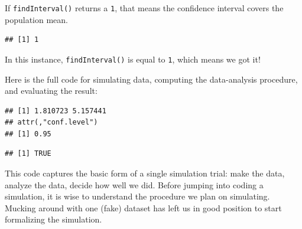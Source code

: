 \documentclass[
]{book}
\newenvironment{Shaded}{\begin{snugshade}}{\end{snugshade}}
\newcommand{\AttributeTok}[1]{\textcolor[rgb]{0.13,0.29,0.53}{#1}}
\newcommand{\CommentTok}[1]{\textcolor[rgb]{0.56,0.35,0.01}{\textit{#1}}}
\newcommand{\DecValTok}[1]{\textcolor[rgb]{0.00,0.00,0.81}{#1}}
\newcommand{\FunctionTok}[1]{\textcolor[rgb]{0.13,0.29,0.53}{\textbf{#1}}}
\newcommand{\NormalTok}[1]{#1}
\newcommand{\OtherTok}[1]{\textcolor[rgb]{0.56,0.35,0.01}{#1}}
\newcommand{\SpecialCharTok}[1]{\textcolor[rgb]{0.81,0.36,0.00}{\textbf{#1}}}
\begin{document}
If \texttt{findInterval()} returns a \texttt{1}, that means the confidence interval covers the population mean.

\begin{Shaded}
\end{Shaded}

\begin{verbatim}
## [1] 1
\end{verbatim}

In this instance, \texttt{findInterval()} is equal to \texttt{1}, which means we got it!

Here is the full code for simulating data, computing the data-analysis procedure, and evaluating the result:

\begin{Shaded}
\end{Shaded}

\begin{verbatim}
## [1] 1.810723 5.157441
## attr(,"conf.level")
## [1] 0.95
\end{verbatim}

\begin{Shaded}
\end{Shaded}

\begin{verbatim}
## [1] TRUE
\end{verbatim}

This code captures the basic form of a single simulation trial: make the data, analyze the data, decide how well we did.
Before jumping into coding a simulation, it is wise to understand the procedure we plan on simulating.
Mucking around with one (fake) dataset has left us in good position to start formalizing the simulation.
\end{document}

